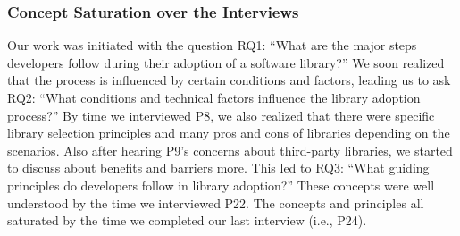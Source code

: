 \subsubsection{Concept Saturation over the Interviews}
%
Our work was initiated with the question RQ1: ``What are the major steps developers follow during their adoption of a software library?'' We soon realized that the process is influenced by certain conditions and factors, leading us to ask RQ2: ``What conditions and technical factors influence the library adoption process?'' 
By time we interviewed P8, we also realized that there were specific library selection principles and many pros and cons of libraries depending on the scenarios. Also after hearing P9's concerns about third-party libraries, we started to discuss about benefits and barriers more. This led to RQ3: ``What guiding principles do developers follow in library adoption?'' These concepts were well understood by the time we interviewed P22. The concepts and principles all saturated by the time we completed our last interview (i.e., P24).


